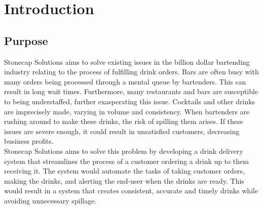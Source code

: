 \documentclass{article}
\begin{document}
\newpage
\section{Introduction}
\subsection{Purpose} %
    Stonecap Solutions aims to solve existing issues in the billion dollar bartending industry relating to the process of fulfilling drink orders. Bars are often busy with many orders being processed through a mental queue by bartenders. This can result in long wait times. Furthermore, many restaurants and bars are susceptible to being understaffed, further exasperating this issue. Cocktails and other drinks are imprecisely made, varying in volume and consistency. When bartenders are rushing around to make these drinks, the risk of spilling them arises. If these issues are severe enough, it could result in unsatisfied customers, decreasing business profits. \\

    Stonecap Solutions aims to solve this problem by developing a drink delivery system that streamlines the process of a customer ordering a drink up to them receiving it. The system would automate the tasks of taking customer orders, making the drinks, and alerting the end-user when the drinks are ready. This would result in a system that creates consistent, accurate and timely drinks while avoiding unnecessary spillage.
\end{document}
